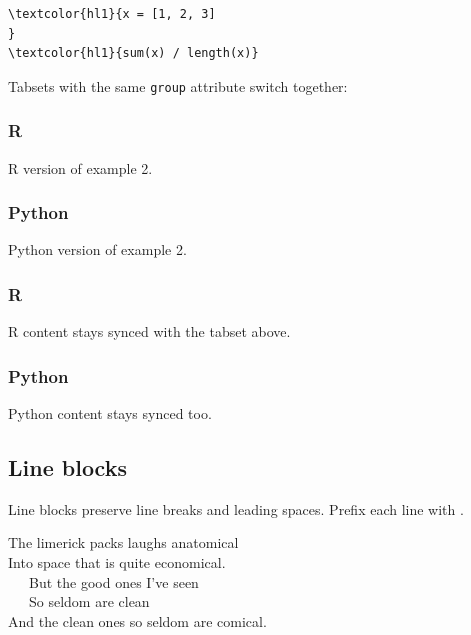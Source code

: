 \documentclass[11pt]{article}
\begin{document}
\begin{srccode}
\begin{Verbatim}[commandchars=\\\{\}]
\textcolor{hl1}{x = [1, 2, 3]
}
\textcolor{hl1}{sum(x) / length(x)}
\end{Verbatim}
\end{srccode}

Tabsets with the same \texttt{group} attribute switch together:



\subsubsection*{R}
\label{r}

R version of example 2.

\subsubsection*{Python}
\label{python}

Python version of example 2.



\subsubsection*{R}
\label{r}

R content stays synced with the tabset above.

\subsubsection*{Python}
\label{python}

Python content stays synced too.



\subsection*{Line blocks}
\label{line-blocks}

Line blocks preserve line breaks and leading spaces. Prefix each line with \texttt{\textbar{}}.

The limerick packs laughs anatomical\\
Into space that is quite economical.\\
~~~But the good ones I've seen\\
~~~So seldom are clean\\
And the clean ones so seldom are comical.
\end{document}
